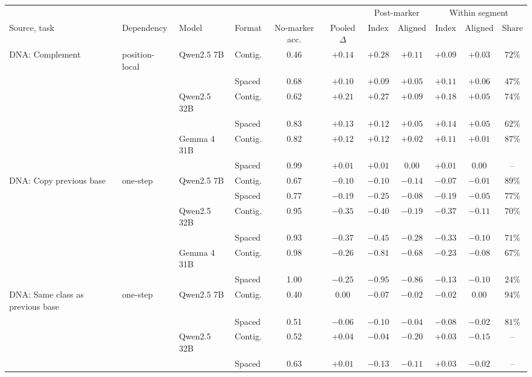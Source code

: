 \begin{tabular}{llll cc cc cc c}
\toprule
& & & & & & \multicolumn{2}{c}{Post-marker} & \multicolumn{3}{c}{Within segment} \\
\cmidrule(lr){7-8}\cmidrule(lr){9-11}
Source, task & Dependency & Model & Format & No-marker acc. & Pooled $\Delta$ & Index & Aligned & Index & Aligned & Share \\
\midrule
DNA: Complement & position-local & Qwen2.5 7B & Contig. & 0.46 & $+0.14$ & $\mathbf{+0.28}$ & $+0.11$ & $+0.09$ & $+0.03$ & $72\%$ \\
 &  &  & Spaced & 0.68 & $+0.10$ & $+0.09$ & $+0.05$ & $+0.11$ & $+0.06$ & $47\%$ \\
 &  & Qwen2.5 32B & Contig. & 0.62 & $+0.21$ & $\mathbf{+0.27}$ & $+0.09$ & $+0.18$ & $+0.05$ & $74\%$ \\
 &  &  & Spaced & 0.83 & $+0.13$ & $+0.12$ & $+0.05$ & $+0.14$ & $+0.05$ & $62\%$ \\
 &  & Gemma 4 31B & Contig. & 0.82 & $+0.12$ & $+0.12$ & $+0.02$ & $+0.11$ & $+0.01$ & $87\%$ \\
 &  &  & Spaced & 0.99 & $+0.01$ & $+0.01$ & $0.00$ & $+0.01$ & $0.00$ & -- \\
\addlinespace
DNA: Copy previous base & one-step & Qwen2.5 7B & Contig. & 0.67 & $-0.10$ & $-0.10$ & $-0.14$ & $-0.07$ & $-0.01$ & $89\%$ \\
 &  &  & Spaced & 0.77 & $-0.19$ & $\mathbf{-0.25}$ & $-0.08$ & $-0.19$ & $-0.05$ & $77\%$ \\
 &  & Qwen2.5 32B & Contig. & 0.95 & $-0.35$ & $\mathbf{-0.40}$ & $-0.19$ & $-0.37$ & $-0.11$ & $70\%$ \\
 &  &  & Spaced & 0.93 & $-0.37$ & $\mathbf{-0.45}$ & $-0.28$ & $-0.33$ & $-0.10$ & $71\%$ \\
 &  & Gemma 4 31B & Contig. & 0.98 & $-0.26$ & $\mathbf{-0.81}$ & $-0.68$ & $-0.23$ & $-0.08$ & $67\%$ \\
 &  &  & Spaced & 1.00 & $-0.25$ & $\mathbf{-0.95}$ & $-0.86$ & $-0.13$ & $-0.10$ & $24\%$ \\
\addlinespace
DNA: Same class as previous base & one-step & Qwen2.5 7B & Contig. & 0.40 & $0.00$ & $-0.07$ & $-0.02$ & $-0.02$ & $0.00$ & $94\%$ \\
 &  &  & Spaced & 0.51 & $-0.06$ & $-0.10$ & $-0.04$ & $-0.08$ & $-0.02$ & $81\%$ \\
 &  & Qwen2.5 32B & Contig. & 0.52 & $+0.04$ & $-0.04$ & $-0.20$ & $+0.03$ & $-0.15$ & -- \\
 &  &  & Spaced & 0.63 & $+0.01$ & $-0.13$ & $-0.11$ & $+0.03$ & $-0.02$ & -- \\

\end{tabular}

